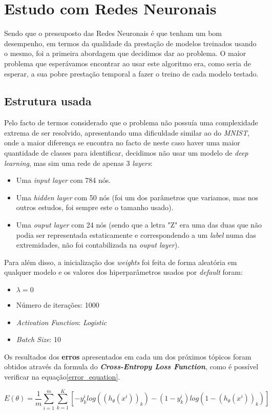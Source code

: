 \section{Estudo com Redes Neuronais}
Sendo que o pressuposto das Redes Neuronais é que tenham um bom desempenho, em termos da qualidade da prestação de modelos treinados usando o mesmo, foi a primeira abordagem que decidimos dar ao problema. O maior problema que esperávamos encontrar ao usar este algoritmo era, como seria de esperar, a sua pobre prestação temporal a fazer o treino de cada modelo testado.

\subsection{Estrutura usada}
Pelo facto de termos considerado que o problema não possuía uma complexidade extrema de ser resolvido, apresentando uma dificuldade similar ao do \textit{MNIST}, onde a maior diferença se encontra no facto de neste caso haver uma maior quantidade de classes para identificar, decidimos não usar um modelo de \textit{deep learning}, mas sim uma rede de apenas 3 \textit{layers}:
\begin{itemize}
\item Uma \textit{input layer} com 784 nós.
\item Uma \textit{hidden layer} com 50 nós (foi um dos parâmetros que variamos, mas nos outros estudos, foi sempre este o tamanho usado).
\item Uma \textit{ouput layer} com 24 nós (sendo que a letra "Z" era uma das duas que não podia ser representada estaticamente e correspondendo a um \textit{label} numa das extremidades, não foi contabilizada na \textit{ouput layer}).
\end{itemize}
Para além disso, a inicialização dos \textit{weights} foi feita de forma aleatória em qualquer modelo e os valores dos hiperparâmetros usados por \textit{default} foram:
\begin{itemize}
\item $\lambda = 0$
\item Número de iterações: 1000
\item \textit{Activation Function}: \textit{Logistic}
\item \textit{Batch Size}: 10
\end{itemize}
Os resultados dos \textbf{erros} apresentados em cada um dos próximos tópicos foram obtidos através da formula do \textbf{\textit{Cross-Entropy Loss Function}}, como é possível verificar na equação\ref{error_equation}.
\begin{figure*}[!t]
   \begin{equation}
		E(\theta) = \frac{1}{m}\sum_{i=1}^{m} \sum_{k=1}^{K} [-y_{k}^{i} log((h_{\theta}(x^{i}))_{k}) - (1 - y_{k}^{i}) log(1 - (h_{\theta}(x^{i}))_{k})]
        \label{error_equation}
	\end{equation}
\end{figure*}


